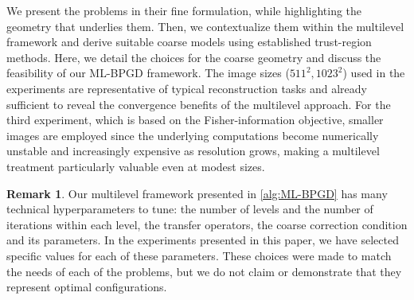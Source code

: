 \documentclass[11pt,reqno]{amsart}
\numberwithin{equation}{section}
\numberwithin{figure}{section}
\theoremstyle{plain}
\theoremstyle{definition}
\newtheorem{remark}[theorem]{Remark}
\begin{document}
We present the problems in their fine formulation, while highlighting the geometry that underlies them. Then, we contextualize them within the multilevel framework and 
derive suitable coarse models using established trust-region methods. Here, we detail the choices for the coarse geometry and discuss the feasibility of our ML-BPGD framework. 
The image sizes ($511^2, 1023^2$) used in the experiments are representative of typical reconstruction tasks and already sufficient to reveal the convergence benefits of the multilevel approach. For the third experiment, which is based on the Fisher-information objective, smaller images are employed since the underlying computations become numerically unstable and increasingly expensive as resolution grows, making a multilevel treatment particularly valuable even at modest sizes.

\begin{remark}
    Our multilevel framework presented in \cref{alg:ML-BPGD} has many technical hyperparameters to tune: the number of levels and 
    the number of iterations within each level, the transfer operators, the coarse correction condition and its parameters. In the experiments presented in this paper, we have selected specific values for each of these parameters. These choices were made to match the needs of each of the problems, but we do not claim or demonstrate that they represent optimal configurations.
\end{remark}
\end{document}
